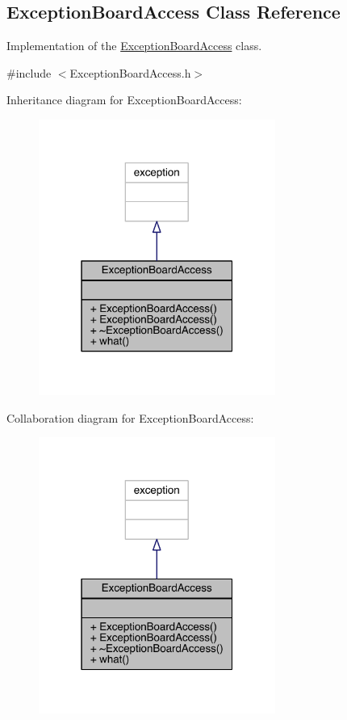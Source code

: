 \hypertarget{a00025}{}\subsection{Exception\+Board\+Access Class Reference}
\label{a00025}


Implementation of the \hyperlink{a00025}{Exception\+Board\+Access} class.  




{\ttfamily \#include $<$Exception\+Board\+Access.\+h$>$}



Inheritance diagram for Exception\+Board\+Access\+:\nopagebreak
\begin{figure}[H]
\begin{center}
\leavevmode
\includegraphics[width=220pt]{a00159}
\end{center}
\end{figure}


Collaboration diagram for Exception\+Board\+Access\+:\nopagebreak
\begin{figure}[H]
\begin{center}
\leavevmode
\includegraphics[width=220pt]{a00160}
\end{center}
\end{figure}

